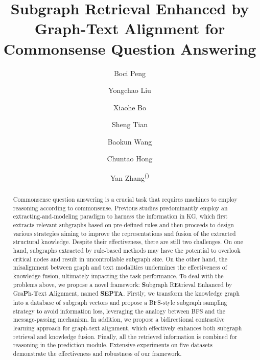 \documentclass[runningheads]{llncs}
\begin{document}
\title{Subgraph Retrieval Enhanced by Graph-Text Alignment for Commonsense Question Answering}


\author{Boci Peng \and
Yongchao Liu \and
Xiaohe Bo \and
Sheng Tian \and
Baokun Wang \and
Chuntao Hong \and
Yan Zhang\textsuperscript{(\Letter)}}
%



\maketitle

\begin{abstract}
Commonsense question answering is a crucial task that requires machines to employ reasoning according to commonsense. Previous studies predominantly employ an extracting-and-modeling paradigm to harness the information in KG, which first extracts relevant subgraphs based on pre-defined rules and then proceeds to design various strategies aiming to improve the representations and fusion of the extracted structural knowledge. Despite their effectiveness, there are still two challenges. On one hand, subgraphs extracted by rule-based methods may have the potential to overlook critical nodes and result in uncontrollable subgraph size. On the other hand, the misalignment between graph and text modalities undermines the effectiveness of knowledge fusion, ultimately impacting the task performance. To deal with the problems above, we propose a novel framework: \textbf{S}ubgraph R\textbf{E}trieval Enhanced by Gra\textbf{P}h-\textbf{T}ext \textbf{A}lignment, named \textbf{SEPTA}. Firstly, we transform the knowledge graph into a database of subgraph vectors and propose a BFS-style subgraph sampling strategy to avoid information loss, leveraging the analogy between BFS and the message-passing mechanism. In addition, we propose a bidirectional contrastive learning approach for graph-text alignment, which effectively enhances both subgraph retrieval and knowledge fusion. Finally, all the retrieved information is combined for reasoning in the prediction module. Extensive experiments on five datasets demonstrate the effectiveness and robustness of our framework.

\end{abstract}
\end{document}
